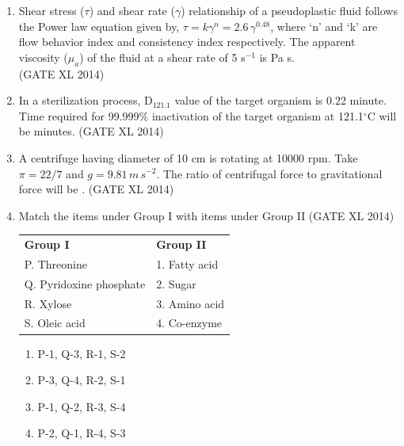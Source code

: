 \documentclass[journal,12pt,onecolumn]{IEEEtran}
\theoremstyle{remark}
\begin{document}
\begin{enumerate}
    \item Shear stress ($\tau$) and shear rate ($\gamma$) relationship of a pseudoplastic fluid follows the Power law equation given by, $\tau = k \gamma^n = 2.6 \, \gamma^{0.48}$, where ‘n’ and ‘k’ are flow behavior index and consistency index respectively. The apparent viscosity ($\mu_a$) of the fluid at a shear rate of 5 s$^{-1}$ is \underline{\hspace{3cm}} Pa s.  \\
    \hfill (GATE XL 2014)\\

    \item In a sterilization process, D$_{121.1}$ value of the target organism is 0.22 minute. Time required for 99.999\% inactivation of the target organism at 121.1$^\circ$C will be \underline{\hspace{3cm}} minutes.  
    \hfill (GATE XL 2014)

\item A centrifuge having diameter of 10 cm is rotating at 10000 rpm. Take $\pi = 22/7$ and $g = 9.81 \, m \, s^{-2}$. The ratio of centrifugal force to gravitational force will be \underline{\hspace{3cm}}.
\hfill (GATE XL 2014)\\


\item Match the items under Group I with items under Group II
\hfill (GATE XL 2014)\\

\begin{tabular}{ll}
\textbf{Group I} & \textbf{Group II} \\
P. Threonine & 1. Fatty acid \\
Q. Pyridoxine phosphate & 2. Sugar \\
R. Xylose & 3. Amino acid \\
S. Oleic acid & 4. Co-enzyme \\
\end{tabular}

\begin{multicols}{2}
\begin{enumerate}
\item P-1, Q-3, R-1, S-2
\item P-3, Q-4, R-2, S-1
\item P-1, Q-2, R-3, S-4
\item P-2, Q-1, R-4, S-3
\end{enumerate}
\end{multicols}



\end{enumerate}
\end{document}
